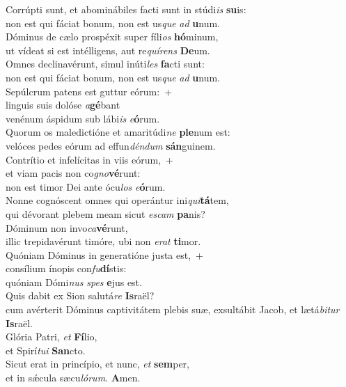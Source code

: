 \evenverse Corrúpti sunt, et abominábiles facti sunt in stúdi\textit{is} \textbf{su}is:~\*\\
\evenverse non est qui fáciat bonum, non est us\textit{que} \textit{ad} \textbf{u}num.\\
\oddverse Dóminus de cælo prospéxit super fíli\textit{os} \textbf{hó}minum,~\*\\
\oddverse ut vídeat si est intélligens, aut re\textit{quí}\textit{rens} \textbf{De}um.\\
\evenverse Omnes declinavérunt, simul inúti\textit{les} \textbf{fa}cti sunt:~\*\\
\evenverse non est qui fáciat bonum, non est us\textit{que} \textit{ad} \textbf{u}num.\\
\oddverse Sepúlcrum patens est guttur eórum:~+\\
\oddverse  linguis suis dolóse \textit{a}\textbf{gé}bant~\*\\
\oddverse venénum áspidum sub lábi\textit{is} \textit{e}\textbf{ó}rum.\\
\evenverse Quorum os maledictióne et amaritúdi\textit{ne} \textbf{ple}num est:~\*\\
\evenverse velóces pedes eórum ad effun\textit{dén}\textit{dum} \textbf{sán}guinem.\\
\oddverse Contrítio et infelícitas in viis eórum,~+\\
\oddverse  et viam pacis non co\textit{gno}\textbf{vé}runt:~\*\\
\oddverse non est timor Dei ante ócu\textit{los} \textit{e}\textbf{ó}rum.\\
\evenverse Nonne cognóscent omnes qui operántur ini\textit{qui}\textbf{tá}tem,~\*\\
\evenverse qui dévorant plebem meam sicut \textit{e}\textit{scam} \textbf{pa}nis?\\
\oddverse Dóminum non invo\textit{ca}\textbf{vé}runt,~\*\\
\oddverse illic trepidavérunt timóre, ubi non \textit{e}\textit{rat} \textbf{ti}mor.\\
\evenverse Quóniam Dóminus in generatióne justa est,~+\\
\evenverse  consílium ínopis con\textit{fu}\textbf{dí}stis:~\*\\
\evenverse quóniam Dómi\textit{nus} \textit{spes} \textbf{e}jus est.\\
\oddverse Quis dabit ex Sion salutá\textit{re} \textbf{Is}raël?~\*\\
\oddverse cum avérterit Dóminus captivitátem plebis suæ, exsultábit Jacob, et lætá\textit{bi}\textit{tur} \textbf{Is}raël.\\
\evenverse Glória Patri, \textit{et} \textbf{Fí}lio,~\*\\
\evenverse et Spirí\textit{tu}\textit{i} \textbf{San}cto.\\
\oddverse Sicut erat in princípio, et nunc, \textit{et} \textbf{sem}per,~\*\\
\oddverse et in sǽcula sæcu\textit{ló}\textit{rum}. \textbf{A}men.\\
